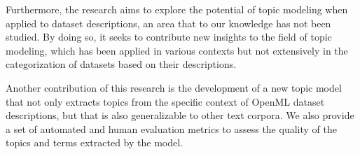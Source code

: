 Furthermore, the research aims to explore the potential of topic modeling when applied to dataset descriptions, an area that to our knowledge has not been studied. By doing so, it seeks to contribute new insights to the field of topic modeling, which has been applied in various contexts but not extensively in the categorization of datasets based on their descriptions.

Another contribution of this research is the development of a new topic model that not only extracts topics from the specific context of OpenML dataset descriptions, but that is also generalizable to other text corpora. We also provide a set of automated and human evaluation metrics to assess the quality of the topics and terms extracted by the model.